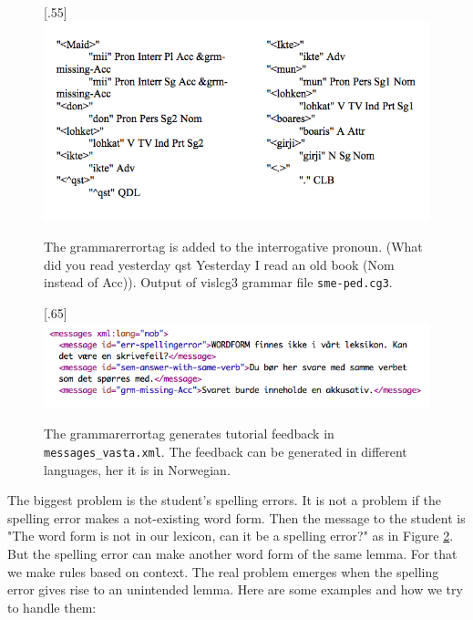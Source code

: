\documentclass[a4paper,12pt]{article}
\begin{document}
\begin{figure}[htbp]
\begin{center}
\scalebox{.55}[.55]{\includegraphics{img/maid_lohket_ikte2.png}}
\caption{The grammarerrortag is added to the interrogative pronoun. (What did you read yesterday qst Yesterday I read an old book (Nom instead of Acc)). Output of vislcg3 grammar file \texttt{sme-ped.cg3}.}
\label{maidlohket}
\end{center}
\end{figure}



\begin{figure}[htbp]
\begin{center}
\scalebox{.65}[.65]{\includegraphics{img/messages_vasta.png}}
\caption{The grammarerrortag generates tutorial feedback in \texttt{messages\_vasta.xml}. The feedback can be generated in different languages, her it is in Norwegian.}
\label{messv}
\end{center}
\end{figure}

The biggest problem is the student's spelling errors. It is not a problem if the spelling error makes a not-existing word form. Then the message to the student is  "The word form is not in our lexicon, can it be a spelling error?" as in Figure \ref{messv}. But the spelling error can make another word form of the same lemma. For that we make rules based on context. The real problem emerges when the spelling error gives rise to an unintended lemma. Here are some examples and how we try to handle them:\\
\end{document}
